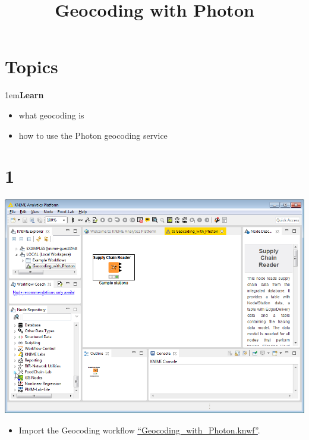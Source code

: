 \documentclass[10pt]{beamer}
\title{Geocoding with Photon}
\date{}
\begin{document}
\maketitle

\section{Topics}
\begin{frame}
\leftskip1em\textbf{Learn}
	\begin{itemize}
    \item what geocoding is
    \item how to use the Photon geocoding service
	\end{itemize}
\end{frame}

\section{1}
\begin{frame}
	\begin{center}
  		\includegraphics[height=0.6\textheight]{1.png}
	\end{center}
	\begin{itemize}
		\item Import the Geocoding workflow  \textcolor{blue}{\underline{\href{https://github.com/SiLeBAT/BfROpenLabResources/raw/master/GitHubPages/workflows/Geocoding\_with\_Photon.knwf}{``Geocoding\_with\_Photon.knwf''}}}.
	\end{itemize}
\end{frame}
\end{document}
